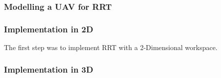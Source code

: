     \subsubsection*{Modelling a \ac{UAV} for RRT}

    \subsubsection{Implementation in 2D}
    The first step was to implement RRT with a 2-Dimensional workspace. 
    

    \subsubsection{Implementation in 3D}
    
